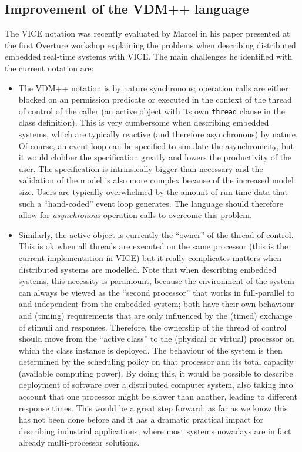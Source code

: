 \subsection{Improvement of the VDM++ language}

The VICE notation was recently evaluated by Marcel in his paper
\cite{viceeval} presented at the first Overture workshop explaining the
problems when describing distributed embedded real-time systems with VICE.
The main challenges he identified with the current notation are:

\begin{itemize}
\item The VDM++ notation is by nature synchronous; operation calls are
either blocked on an permission predicate or executed in the context of
the thread of control of the caller (an active object with its own
\verb+thread+ clause in the class definition). This is very cumbersome
when describing embedded systems, which are typically reactive (and 
therefore asynchronous) by nature. Of course, an event loop can be
specified to simulate the asynchronicity, but it would clobber the
specification greatly and lowers the productivity of the user. The
specification is intrinsically bigger than necessary and the validation
of the model is also more complex because of the increased model size.
Users are typically overwhelmed by the amount of run-time data that such
a ``hand-coded'' event loop generates. The language should therefore
allow for \textit{asynchronous} operation calls to overcome this problem. 

\item Similarly, the active object is currently the ``owner'' of the thread
of control. This is ok when all threads are executed on the same processor
(this is the current implementation in VICE) but it really complicates
matters when distributed systems are modelled. Note that when describing
embedded systems, this necessity is paramount, because the environment of
the system can always be viewed as the ``second processor'' that works in
full-parallel to and independent from the embedded system; both have their
own behaviour and (timing) requirements that are only influenced by the
(timed) exchange of stimuli and responses. Therefore, the ownership of the
thread of control should move from the ``active class'' to the (physical
or virtual) processor on which the class instance is deployed. The behaviour
of the system is then determined by the scheduling policy on that processor
and its total capacity (available computing power).  By doing this, it would
be possible to describe deployment of software over a distributed computer
system, also taking into account that one processor might be slower than
another, leading to different response times. This would be a great step
forward; as far as we know this has not been done before and it has a
dramatic practical impact for describing industrial applications, where
most systems nowadays are in fact already multi-processor solutions. 


\end{itemize}
